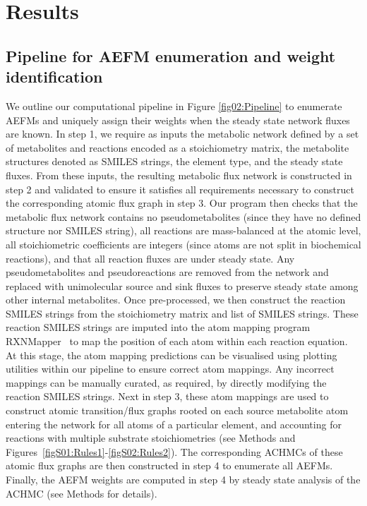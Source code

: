 \documentclass[12pt]{article}
\begin{document}
\section*{Results}

\subsection*{Pipeline for AEFM enumeration and weight identification}

We outline our computational pipeline in Figure \ref{fig02:Pipeline} to
enumerate AEFMs and uniquely assign their weights when the steady state
network fluxes are known. In step 1, we require as inputs the metabolic
network defined by a set of metabolites and reactions encoded as
a stoichiometry matrix, the metabolite structures denoted as SMILES
strings, the element type, and the steady state fluxes. From these inputs,
the resulting metabolic flux network is constructed in step 2 and
validated to ensure it satisfies all requirements necessary to construct
the corresponding atomic flux graph in step 3. Our program then checks
that the metabolic flux network contains no pseudometabolites (since they
have no defined structure nor SMILES string), all reactions are
mass-balanced at the atomic level, all stoichiometric coefficients are
integers (since atoms are not split in biochemical reactions), and that
all reaction fluxes are under steady state. Any pseudometabolites and
pseudoreactions are removed from the network and replaced with
unimolecular source and sink fluxes to preserve steady state among other
internal metabolites. Once pre-processed, we then construct the reaction
SMILES strings from the stoichiometry matrix and list of SMILES strings.
These reaction SMILES strings are imputed into the atom mapping program
RXNMapper~\citep{Schwaller2021extraction} to map the position of each atom
within each reaction equation. At this stage, the atom mapping predictions
can be visualised using plotting utilities within our pipeline to ensure
correct atom mappings. Any incorrect mappings can be manually curated, as
required, by directly modifying the reaction SMILES strings. Next in step
3, these atom mappings are used to construct atomic transition/flux graphs
rooted on each source metabolite atom entering the network for all atoms
of a particular element, and accounting for reactions with multiple
substrate stoichiometries (see Methods and
Figures~{\ref{figS01:Rules1}}-{\ref{figS02:Rules2}}). The corresponding
ACHMCs of these atomic flux graphs are then constructed in step 4 to
enumerate all AEFMs. Finally, the AEFM weights are computed in step 4 by
steady state analysis of the ACHMC (see Methods for details).
\end{document}
